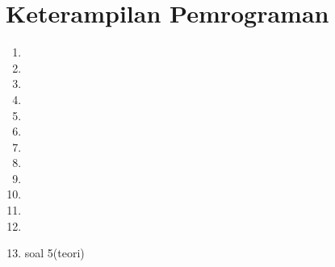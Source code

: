 \chapter*{Keterampilan Pemrograman}
\begin{enumerate}
\item 

\item 

\item 

\item 

\item 

\item 

\item 

\item 

\item 

\item 

\item 

\item 

\item soal 5(teori)

\end{enumerate}

